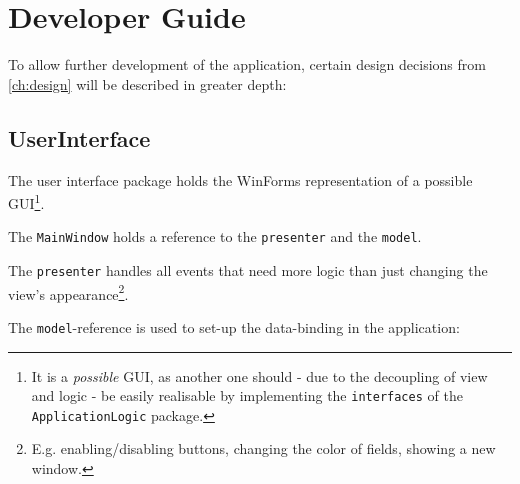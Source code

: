 \chapter{Developer Guide}\label{ch:developer_guide} %

To allow further development of the application, certain design decisions from \autoref{ch:design} will be described in greater depth:

\section{UserInterface}
\label{sec:design_user_interface}

The user interface package holds the WinForms representation of a possible \ac{GUI}\footnote{It is a \textit{possible} \ac{GUI}, as  another one should - due to the decoupling of view and logic - be easily realisable by implementing the \texttt{interfaces} of the \texttt{ApplicationLogic} package.}.

The \texttt{MainWindow} holds a reference to the \texttt{presenter} and the \texttt{model}.

The \texttt{presenter} handles all events that need more logic than just changing the view's appearance\footnote{E.g. enabling/disabling buttons, changing the color of fields, showing a new window.}.

The \texttt{model}-reference is used to set-up the data-binding in the application:

